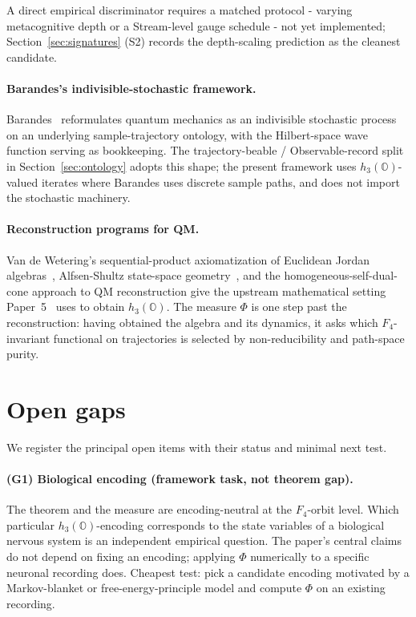 \documentclass[12pt]{article}
\theoremstyle{remark}
\newcommand{\hthree}{h_3(\mathbb{O})}
\newcommand{\Ffour}{F_4}
\newcommand{\Phiexp}{\Phi}
\begin{document}
A direct empirical discriminator requires a matched protocol -
varying metacognitive depth or a Stream-level gauge schedule - not
yet implemented; Section~\ref{sec:signatures} (S2) records the
depth-scaling prediction as the cleanest candidate.

\paragraph{Barandes's indivisible-stochastic framework.}
Barandes~\cite{barandes2023stochquantum} reformulates quantum
mechanics as an indivisible stochastic process on an underlying
sample-trajectory ontology, with the Hilbert-space wave function
serving as bookkeeping. The trajectory-beable / Observable-record
split in Section~\ref{sec:ontology} adopts this shape; the
present framework uses $\hthree$-valued iterates where Barandes
uses discrete sample paths, and does not import the stochastic
machinery.

\paragraph{Reconstruction programs for QM.}
Van de Wetering's sequential-product axiomatization of Euclidean
Jordan algebras~\cite{vdw2019a,vdw2019b}, Alfsen-Shultz state-space
geometry~\cite{alfsen-shultz2001}, and the homogeneous-self-dual-cone
approach to QM reconstruction give the upstream mathematical setting
Paper~5~\cite{ehrlich2026qm} uses to obtain $\hthree$. The measure
$\Phiexp$ is one step past the reconstruction: having obtained the
algebra and its dynamics, it asks which $\Ffour$-invariant functional
on trajectories is selected by non-reducibility and path-space
purity.


\section{Open gaps}
\label{sec:gaps}

We register the principal open items with their status and minimal
next test.

\paragraph{(G1) Biological encoding (framework task, not theorem gap).}
The theorem and the measure are encoding-neutral at the $\Ffour$-orbit
level. Which particular $\hthree$-encoding corresponds to the state
variables of a biological nervous system is an independent empirical
question. The paper's central claims do not depend on fixing an
encoding; applying $\Phiexp$ numerically to a specific neuronal
recording does. Cheapest test: pick a candidate encoding motivated by a
Markov-blanket or free-energy-principle model and compute
$\Phiexp$ on an existing recording.
\end{document}
